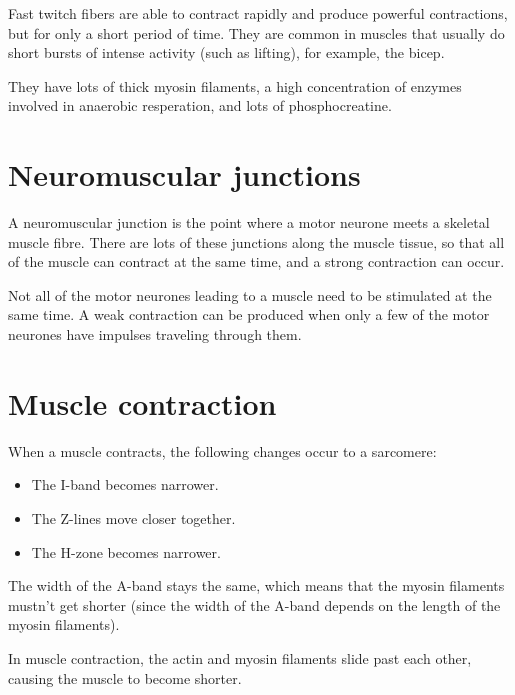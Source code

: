 \documentclass{article}
\begin{document}
Fast twitch fibers are able to contract rapidly and produce powerful
contractions, but for only a short period of time. They are common in muscles
that usually do short bursts of intense activity (such as lifting), for example,
the bicep.

They have lots of thick myosin filaments, a high concentration of enzymes
involved in anaerobic resperation, and lots of
phosphocreatine.

\section*{Neuromuscular junctions}

A neuromuscular junction is the point where a motor neurone meets a skeletal
muscle fibre. There are lots of these junctions along the muscle tissue, so that
all of the muscle can contract at the same time, and a strong contraction can
occur.

Not all of the motor neurones leading to a muscle need to be stimulated at the
same time. A weak contraction can be produced when only a few of the motor
neurones have impulses traveling through them.

\section*{Muscle contraction}

When a muscle contracts, the following changes occur to a sarcomere:

\begin{itemize}

	\item The I-band becomes narrower.

	\item The Z-lines move closer together. 

	\item The H-zone becomes narrower.

\end{itemize}

The width of the A-band stays the same, which means that the myosin filaments
mustn't get shorter (since the width of the A-band depends on the length of the
myosin filaments).

In muscle contraction, the actin and myosin filaments slide past each other,
causing the muscle to become shorter.
\end{document}
